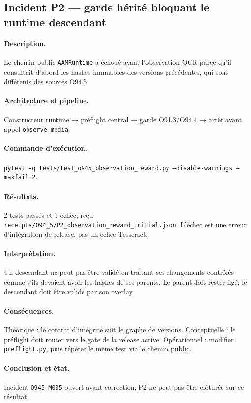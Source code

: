 \documentclass[11pt,a4paper]{article}
\begin{document}
\subsection{Incident P2 — garde hérité bloquant le runtime descendant}
\paragraph{Description.} Le chemin public \texttt{AAMRuntime} a échoué avant l'observation OCR parce qu'il consultait d'abord les hashes immuables des versions précédentes, qui sont différents des sources O94.5.
\paragraph{Architecture et pipeline.} Constructeur runtime → préflight central → garde O94.3/O94.4 → arrêt avant appel \texttt{observe\_media}.
\paragraph{Commande d'exécution.} \texttt{pytest -q tests/test\_o945\_observation\_reward.py --disable-warnings --maxfail=2}.
\paragraph{Résultats.} 2 tests passés et 1 échec; reçu \texttt{receipts/O94\_5/P2\_observation\_reward\_initial.json}. L'échec est une erreur d'intégration de release, pas un échec Tesseract.
\paragraph{Interprétation.} Un descendant ne peut pas être validé en traitant ses changements contrôlés comme s'ils devaient avoir les hashes de ses parents. Le parent doit rester figé; le descendant doit être validé par son overlay.
\paragraph{Conséquences.} Théorique : le contrat d'intégrité suit le graphe de versions. Conceptuelle : le préflight doit router vers le gate de la release active. Opérationnel : modifier \texttt{preflight.py}, puis répéter le même test via le chemin public.
\paragraph{Conclusion et état.} Incident \texttt{O945-M005} ouvert avant correction; P2 ne peut pas être clôturée sur ce résultat.
\end{document}
